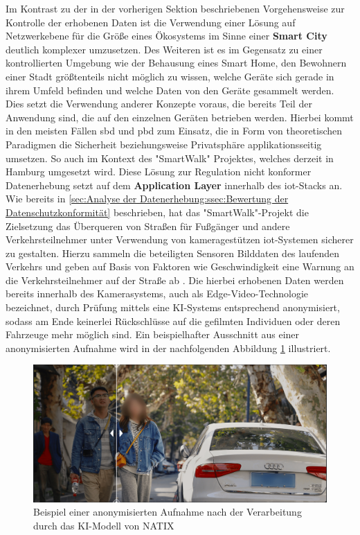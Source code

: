 Im Kontrast zu der in der vorherigen Sektion  beschriebenen Vorgehensweise zur Kontrolle der erhobenen Daten ist die Verwendung einer Lösung auf Netzwerkebene für die Größe eines Ökosystems im Sinne einer \textbf{Smart City} deutlich komplexer umzusetzen. 
Des Weiteren ist es im Gegensatz zu einer kontrollierten Umgebung wie der Behausung eines Smart Home, den Bewohnern einer Stadt größtenteils nicht möglich zu wissen, welche Geräte sich gerade in ihrem Umfeld befinden und welche Daten von den Geräte gesammelt werden. 
Dies setzt die Verwendung anderer Konzepte voraus, die bereits Teil der Anwendung sind, die auf den einzelnen Geräten betrieben werden. Hierbei kommt in den meisten Fällen \ac{sbd} und \ac{pbd} zum Einsatz, die in Form von theoretischen Paradigmen die Sicherheit beziehungsweise Privatsphäre applikationsseitig umsetzen. 
So auch im Kontext des "SmartWalk" \cite{Natix2022} Projektes, welches derzeit in Hamburg umgesetzt wird. Diese Lösung zur Regulation nicht konformer Datenerhebung setzt auf dem \textbf{Application Layer} innerhalb des \ac{iot}-Stacks an.
Wie bereits in \ref{sec:Analyse der Datenerhebung:ssec:Bewertung der Datenschutzkonformität} beschrieben, hat das "SmartWalk"-Projekt die Zielsetzung das Überqueren von Straßen für Fußgänger und andere Verkehrsteilnehmer unter Verwendung von kameragestützen \ac{iot}-Systemen sicherer zu gestalten. 
Hierzu sammeln die beteiligten Sensoren Bilddaten des laufenden Verkehrs und geben auf Basis von Faktoren wie Geschwindigkeit eine Warnung an die Verkehrsteilnehmer auf der Straße ab \cite{SmartWalk2022}. 
Die hierbei erhobenen Daten werden bereits innerhalb des Kamerasystems, auch als Edge-Video-Technologie bezeichnet, durch Prüfung mittels eine KI-Systems entsprechend anonymisiert, sodass am Ende keinerlei Rückschlüsse auf die gefilmten Individuen oder deren Fahrzeuge mehr möglich sind. Ein beispielhafter Ausschnitt aus einer anonymisierten Aufnahme wird in der nachfolgenden Abbildung \ref{fig:anonymized-footage} illustriert.

\begin{figure}
    \centering
    \includegraphics[width=\textwidth]{main/countermeasures/pictures/Anonymized_Footage}
    \caption{Beispiel einer anonymisierten Aufnahme nach der Verarbeitung durch das KI-Modell von NATIX \cite{Natix2022}}
    \label{fig:anonymized-footage}
\end{figure}

